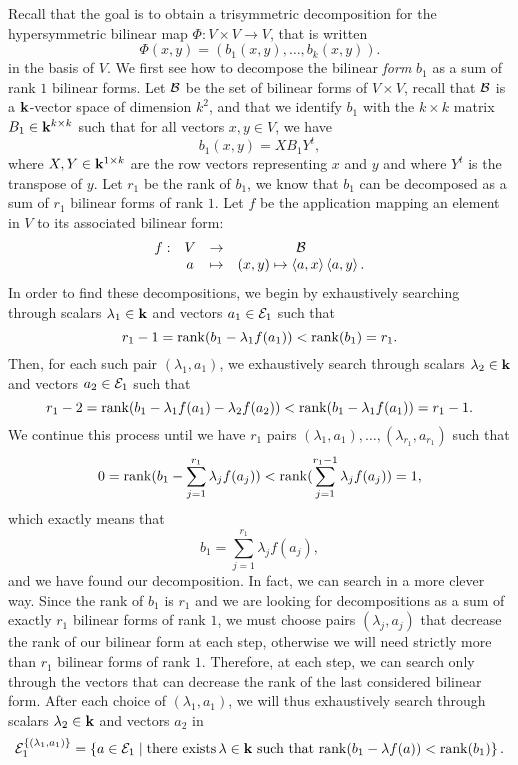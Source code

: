 Recall that the goal is to obtain a trisymmetric decomposition for the
hypersymmetric bilinear map $\Phi:V\times V\to V$, that is written
\[
  \Phi(x, y) = (b_1(x, y), \dots, b_k(x, y)).
\]
in the basis of $V$. We first see how to decompose the bilinear \emph{form}
$b_1$ as a sum of rank $1$ bilinear forms. Let $\mathcal{B}$ be the set of bilinear forms
of $V\times V$, recall that $\mathcal{B}$ is a $\mathbf{k}$-vector space of dimension $k^2$, and
that we identify $b_1$ with the $k\times k$ matrix $B_1\in\mathbf{k}^{k\times k}$ 
such that for all vectors $x, y\in V$, we have
\[
  b_1(x, y) = X B_1 Y^t,
\]
where $X, Y\in\mathbf{k}^{1\times k}$ are the row vectors representing $x$ and $y$ and
where $Y^t$ is the transpose of $y$. Let $r_1$ be the rank of $b_1$, we know
that $b_1$ can be decomposed as a sum of $r_1$ bilinear forms of rank $1$. Let
$f$ be the application mapping an element in $V$ to its associated bilinear
form:
\[
  \begin{array}{cccc}
    f: & V & \to & \mathcal{B}\\
    & a & \mapsto & (x, y)\mapsto\left\langle a,x\right\rangle\left\langle a,y\right\rangle.
  \end{array}
\]
In order to find these decompositions, we begin by exhaustively searching through scalars $\lambda_1\in\mathbf{k}$ and vectors
$a_1\in \mathcal{E}_1$ such that
\[
  r_1-1=\operatorname{rank}(b_1-\lambda_1 f(a_1)) < \operatorname{rank}(b_1)=r_1.
\]
Then, for each such pair $(\lambda_1, a_1)$, we exhaustively search through
scalars $\lambda_2\in\mathbf{k}$ and vectors $a_2\in \mathcal{E}_1$ such that
\[
  r_1-2=\operatorname{rank}(b_1-\lambda_1 f(a_1)-\lambda_2f(a_2)) < \operatorname{rank}(b_1-\lambda_1
  f(a_1))=r_1-1.
\]
We continue this process until we have $r_1$ pairs $(\lambda_1, a_1), \dots,
(\lambda_{r_1}, a_{r_1})$ such that
\[
  0 = \operatorname{rank}(b_1-\sum_{j=1}^{r_1}\lambda_jf(a_j)) <
  \operatorname{rank}(\sum_{j=1}^{r_1-1}\lambda_jf(a_j)) = 1,
\]
which exactly means that
\[
  b_1 = \sum_{j=1}^{r_1}\lambda_jf(a_j),
\]
and we have found our decomposition.
In fact, we can search in a more clever way. Since the rank of $b_1$ is $r_1$
and we are looking for decompositions as a sum of exactly $r_1$ bilinear forms of
rank $1$, we must choose
pairs $(\lambda_j, a_j)$ that decrease the rank of our bilinear form at each
step, otherwise we will need strictly more than $r_1$ bilinear forms of rank
$1$. Therefore, at each step, we can search only through the vectors that can
decrease the rank of the last considered bilinear form. After each choice of
$(\lambda_1, a_1)$, we will thus exhaustively search through scalars
$\lambda_2\in\mathbf{k}$ and vectors $a_2$ in
\[
  \mathcal{E}_1^{\left\{ (\lambda_1, a_1) \right\}} = \left\{
    a\in\mathcal{E}_1\mid\text{there exists}\,\lambda\in\mathbf{k}\text{ such that}\,\operatorname{rank}(b_1-\lambda f(a)) <\operatorname{rank}(b_1)
\right\}.
\]
